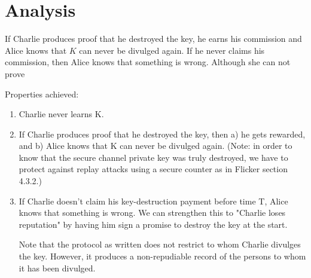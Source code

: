 \documentclass{article}
\begin{document}
\section{Analysis}

If Charlie produces proof that he destroyed the key, he earns his commission and Alice knows that $K$ can never be divulged again. If he never claims his commission, then Alice knows that something is wrong. Although she can not prove 

Properties achieved:

\begin{enumerate}

\item Charlie never learns K.

\item If Charlie produces proof that he destroyed the key, then a) he gets rewarded, and b) Alice knows that K can never be divulged again. (Note: in order to know that the secure channel private key was truly destroyed, we have to protect against replay attacks using a secure counter as in Flicker section 4.3.2.)

\item If Charlie doesn't claim his key-destruction payment before time T, Alice knows that something is wrong. We can strengthen this to "Charlie loses reputation" by having him sign a promise to destroy the key at the start.

Note that the protocol as written does not restrict to whom Charlie divulges the key. However, it produces a non-repudiable record of the persons to whom it has been divulged. 



\end{enumerate}
\end{document}
